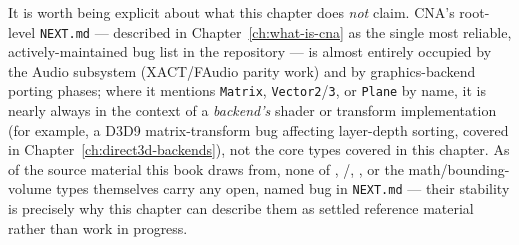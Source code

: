 It is worth being explicit about what this chapter does \emph{not} claim. CNA's root-level
\texttt{NEXT.md} --- described in Chapter~\ref{ch:what-is-cna} as the single most reliable,
actively-maintained bug list in the repository --- is almost entirely occupied by the Audio
subsystem (XACT/FAudio parity work) and by graphics-backend porting phases; where it mentions
\texttt{Matrix}, \texttt{Vector2}/\texttt{3}, or \texttt{Plane} by name, it is nearly always in
the context of a \emph{backend's} shader or transform implementation (for example, a D3D9
matrix-transform bug affecting  layer-depth sorting, covered in
Chapter~\ref{ch:direct3d-backends}), not the core  types
covered in this chapter. As of the source material this book draws from, none of
, /, , or the
math/bounding-volume types themselves carry any open, named bug in \texttt{NEXT.md} --- their
stability is precisely why this chapter can describe them as settled reference material rather
than work in progress.
